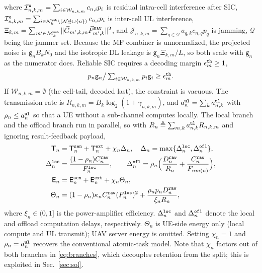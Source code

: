 \documentclass[journal]{IEEEtran}
\begin{document}
where $\mathcal{I}_{n,k,m}^{\tt w}=\sum_{i\in\mathcal{W}_{n,k,m}}c_{n,i} p_i$ is residual intra-cell interference after SIC,
$\mathcal{I}_{n,k,m}^{\tt o}=\sum_{i\in\mathcal{N}_k^{\tt sub}\setminus(\mathcal{N}_m^{\tt ul}\cup\{n\})}c_{n,i} p_i$ is inter-cell UL interference,
$\Xi_{k,m}=\sum_{m'\in\mathcal{M}_k^{\tt sub}}\Vert\vec{G}_{m',k,m}\vec{P}_{m',k}^{\tt UAV}\Vert^2$, and
$\mathcal{J}_{n,k,m}=\sum_{q\in\mathcal{Q}}a_{q,k}c_{n,q} p_q$ is jamming, $\mathcal{Q}$ being the jammer set. 
Because the MF combiner is unnormalized, the projected noise is $\mathsf{g}_nB_kN_0$ and the isotropic DL leakage is $\mathsf{g}_n\Xi_{k,m}/L$, so both scale with $\mathsf{g}_n$ as the numerator does.
Reliable SIC requires a decoding margin $\epsilon_m^{\tt th}\ge1$,
\begin{equation}
\textstyle p_n\mathsf{g}_n\big/\sum_{i\in\mathcal{W}_{n,k,m}}p_i\mathsf{g}_i\ge\epsilon_m^{\tt th}.
\label{eq:sic}
\end{equation}
{\color{blue}If $\mathcal{W}_{n,k,m}=\emptyset$ (the cell-tail, decoded last), the constraint is vacuous.}
The transmission rate is $R_{n,k,m}=B_k\log_2(1+\gamma_{n,k,m})$, and $a_n^{\tt ul}=\sum_k a_{n,k}^{\tt ul}$ with $\rho_n\le a_n^{\tt ul}$ so that a UE without a sub-channel computes locally. The local branch and the offload branch run in parallel, so with $R_n\triangleq\sum_{m,k}a_{n,k}^{\tt ul}R_{n,k,m}$ and ignoring result-feedback payload,
\begin{align}
\mathsf{T}_n&=\mathsf{T}_n^{\tt sen}+\mathsf{T}_n^{\tt ext}+\chi_n\Delta_n,
\quad
\Delta_n=\max\{\Delta_n^{\tt loc},\Delta_n^{\tt ofl}\},
\label{eq:Tn}\\
\Delta_n^{\tt loc}&=\frac{(1-\rho_n)C_n^{\tt raw}}{F_n^{\tt loc}},
\qquad
\Delta_n^{\tt ofl}=\rho_n\Big(\frac{D_n^{\tt raw}}{R_n}+\frac{C_n^{\tt raw}}{F_{n m(n)}}\Big),
\label{eq:branches}\\
\mathsf{E}_n&=\mathsf{E}_n^{\tt sen}+\mathsf{E}_n^{\tt ext}+\chi_n\Theta_n,
\label{eq:En}\\
\Theta_n&=(1-\rho_n)\kappa_n C_n^{\tt raw}(F_n^{\tt loc})^2+\frac{\rho_n p_n D_n^{\tt raw}}{\xi_n R_n},
\label{eq:Theta}
\end{align}
where $\xi_n\in(0,1]$ is the power-amplifier efficiency.
{\color{blue}$\Delta_n^{\tt loc}$ and $\Delta_n^{\tt ofl}$ denote the local and offload computation delays, respectively.}
$\Theta_n$ is UE-side energy only (local compute and UL transmit); UAV server energy is omitted.
Setting $\chi_n=1$ and $\rho_n=a_n^{\tt ul}$ recovers the conventional atomic-task model. Note that $\chi_n$ factors out of both branches in \eqref{eq:branches}, which decouples retention from the split; this is exploited in Sec.~\ref{sec:sol}.
\end{document}
